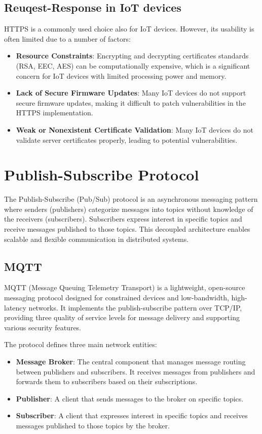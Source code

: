 \subsection{Reuqest-Response in IoT devices}
HTTPS is a commonly used choice also for IoT devices. However, its usability is often limited due to a number of factors:
\begin{itemize}
    \item \textbf{Resource Constraints\cite{mazhar2023iotsecurity}}: Encrypting and decrypting certificates standards (RSA, EEC, AES) can be computationally expensive, which is a significant concern for IoT devices with limited processing power and memory.
    \item \textbf{Lack of Secure Firmware Updates\cite{cyberark2024iot}}: Many IoT devices do not support secure firmware updates, making it difficult to patch vulnerabilities in the HTTPS implementation.
    \item \textbf{Weak or Nonexistent Certificate Validation\cite{bishopfox2020weakcertificates}}: Many IoT devices do not validate server certificates properly, leading to potential vulnerabilities.
\end{itemize}

\section{Publish-Subscribe Protocol}
The Publish-Subscribe (Pub/Sub) protocol is an asynchronous messaging pattern where senders (publishers) categorize messages into topics without knowledge of the receivers (subscribers). Subscribers express interest in specific topics and receive messages published to those topics. This decoupled architecture enables scalable and flexible communication in distributed systems.

\subsection{MQTT}
MQTT (Message Queuing Telemetry Transport) is a lightweight, open-source messaging protocol designed for constrained devices and low-bandwidth, high-latency networks. It implements the publish-subscribe pattern over TCP/IP, providing three quality of service levels for message delivery and supporting various security features.

The protocol defines three main network entities:
\begin{itemize}
    \item \textbf{Message Broker}: The central component that manages message routing between publishers and subscribers. It receives messages from publishers and forwards them to subscribers based on their subscriptions.
    \item \textbf{Publisher}: A client that sends messages to the broker on specific topics. 
    \item \textbf{Subscriber}: A client that expresses interest in specific topics and receives messages published to those topics by the broker.
\end{itemize}

